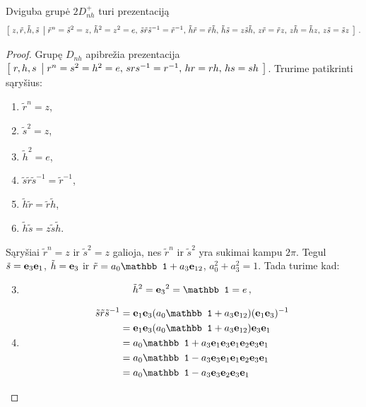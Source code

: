 \begin{proposition}
	Dviguba grupė $2D_{nh}^+$ turi prezentaciją
	\begin{equation}
	\left[\; z,\tilde r,\tilde h,\tilde s \;\left|\; 
		\tilde r^n=\tilde s^2=z,\,
		\tilde h^2=z^2=e,\,
		\tilde s\tilde r\tilde s^{-1}=\tilde r^{-1},\,
		\tilde h\tilde r=\tilde r\tilde h,\,
		\tilde h\tilde s=z\tilde s\tilde h,\,
		z\tilde r=\tilde rz,\,
		z\tilde h=\tilde hz,\,
		z\tilde s=\tilde sz
	 \;\right.\right]\,.
	\end{equation}
\end{proposition}
\begin{proof}
	Grupę $D_{nh}$ apibrežia prezentacija $\left[\; r,h,s \;\left|\; 
		r^n=s^2=h^2=e,\,
		srs^{-1}=r^{-1},\,
		hr=rh,\,
		hs=sh
	 \;\right.\right]$.
	Trurime patikrinti sąryšius:
	\begin{enumerate}
		\item $\tilde r^n=z$,
		\item $\tilde s^2=z$,
		\item $\tilde h^2=e$,
		\item $\tilde s\tilde r\tilde s^{-1}=\tilde r^{-1}$,
		\item $\tilde h\tilde r=\tilde r\tilde h$,
		\item $\tilde h\tilde s=z\tilde s\tilde h$.
	\end{enumerate}
	Sąryšiai $\tilde r^n=z$ ir $\tilde s^2=z$ galioja, nes $\tilde r^n$ ir $\tilde s^2$ yra sukimai kampu $2\pi$.
	Tegul $\tilde s = \vb e_3 \vb e_1$, $\tilde h=\vb e_3$ ir $\tilde r = a_0 \mathbb1 + a_3 \vb e_{12}$, $a_0^2+a_3^2=1$.
	Tada turime kad:
	\begin{enumerate}
			\setcounter{enumi}{2}
		\item
			\begin{equation}
				\tilde h^2 = {\vb e_3}^2 = \mathbb1 = e
				\,,
			\end{equation}
		\item
			\begin{equation} 
				\begin{aligned}
					\tilde s\tilde r\tilde s^{-1}
					&=\vb e_1 \vb e_3 (a_0 \mathbb1 + a_3 \vb e_{12}) (\vb e_1 \vb e_3)^{-1}
					\\&=\vb e_1 \vb e_3 (a_0 \mathbb1 + a_3 \vb e_{12}) \vb e_3 \vb e_1
					\\&=a_0 \mathbb1 + a_3 \vb e_1 \vb e_3 \vb e_1 \vb e_2 \vb e_3 \vb e_1
					\\&=a_0 \mathbb1 - a_3 \vb e_3 \vb e_1 \vb e_1 \vb e_2 \vb e_3 \vb e_1
					\\&=a_0 \mathbb1 - a_3 \vb e_3 \vb e_2 \vb e_3 \vb e_1

\end{aligned}
\end{equation}
\end{enumerate}
\end{proof}
